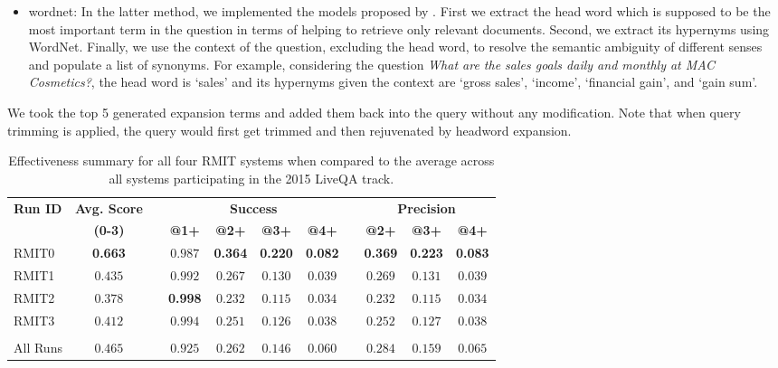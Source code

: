 \documentclass[a4paper,10pt,conference,compsocconf,final]{IEEEtran}
\newcommand\method[1]{{\sf\small{#1}}}
\begin{document}
{{{{\begin{itemize}
  \item \method{wordnet}: In the latter method, we implemented the models
    proposed by \cite{huang2008question, silva2011symbolic}. First we extract
    the head word which is supposed to be the most important term in the
    question in terms of helping to retrieve only relevant documents. Second,
    we extract its hypernyms using WordNet. Finally, we use the context of the
    question, excluding the head word, to resolve the semantic ambiguity of
    different senses and populate a list of synonyms. For example, considering
    the question \textit{What are the sales goals daily and monthly at MAC
    Cosmetics?}, the head word is `sales' and its hypernyms given the context
    are `gross sales', `income', `financial gain', and `gain sum'.
\end{itemize}

We took the top 5 generated expansion terms and added them back into the query
without any modification.  Note that when query trimming is applied, the query
would first get trimmed and then rejuvenated by headword expansion.


\begin{table*}[t]
\centering
\caption{
Effectiveness summary for all four RMIT systems when compared to the
average across all systems participating in the 2015 LiveQA track.
\label{tab:runs}}
\begin{tabular}{lcccccccccc}
\toprule
\multirow{2}{*}{\bf Run ID} & {\bf Avg. Score} && \multicolumn{4}{c}{\bf Success} && \multicolumn{3}{c}{\bf Precision} \\
& {\bf (0-3)} && {\bf @1+} & {\bf @2+} & {\bf @3+} & {\bf @4+} && {\bf @2+} & {\bf @3+} & {\bf @4+} \\
\midrule
RMIT0 &{\bf 0.663}&&$0.987$&{\bf 0.364}&{\bf 0.220}&{\bf 0.082}&&{\bf 0.369}&{\bf 0.223}&{\bf 0.083}\\
RMIT1 &$0.435$&&$0.992$&$0.267$&$0.130$&$0.039$&&$0.269$&$0.131$&$0.039$\\
RMIT2 &$0.378$&&{\bf 0.998}&$0.232$&$0.115$&$0.034$&&$0.232$&$0.115$&$0.034$\\
RMIT3 &$0.412$&&$0.994$&$0.251$&$0.126$&$0.038$&&$0.252$&$0.127$&$0.038$\\
&&&&&&&&&\\
All Runs  &$0.465$&&$0.925$&$0.262$&$0.146$&$0.060$&&$0.284$&$0.159$&$0.065$\\
\bottomrule
\end{tabular}
\end{table*}

}}}}
\end{document}
